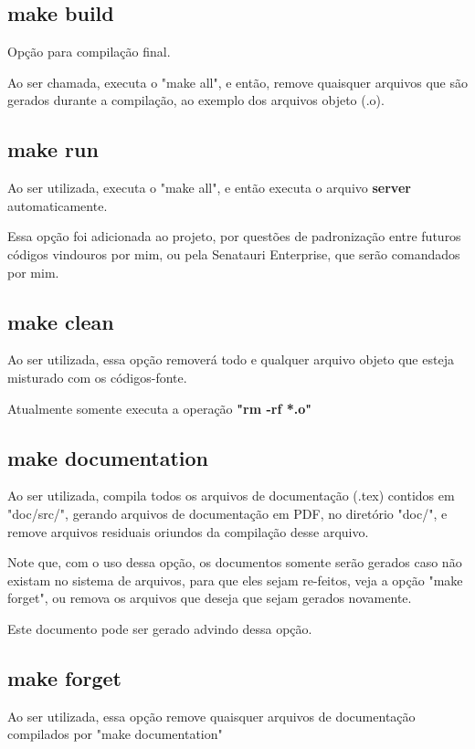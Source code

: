 \documentclass[onecolumn,12pt]{article}
\begin{document}
    	\subsection{make build}
    		Opção para compilação final.\par
    		Ao ser chamada, executa o "make all", e então, remove quaisquer arquivos que são gerados durante a compilação, ao exemplo dos arquivos objeto (.o).
    	
    	\subsection{make run}
    		Ao ser utilizada, executa o "make all", e então executa o arquivo \textbf{server} automaticamente.\par
    		Essa opção foi adicionada ao projeto, por questões de padronização entre futuros códigos vindouros por mim, ou pela Senatauri Enterprise, que serão comandados por mim.
    	
    	\subsection{make clean}
    		Ao ser utilizada, essa opção removerá todo e qualquer arquivo objeto que esteja misturado com os códigos-fonte.\par
    		Atualmente somente executa a operação \textbf{"rm -rf *.o"}
    	
    	\subsection{make documentation}
    		\par Ao ser utilizada, compila todos os arquivos de documentação (.tex) contidos em "doc/src/", gerando arquivos de documentação em PDF, no diretório "doc/", e remove arquivos residuais oriundos da compilação desse arquivo.\par
    		Note que, com o uso dessa opção, os documentos somente serão gerados caso não existam no sistema de arquivos, para que eles sejam re-feitos, veja a opção "make forget", ou remova os arquivos que deseja que sejam gerados novamente.\par
    		Este documento pode ser gerado advindo dessa opção.
    		
    	\subsection{make forget}
    		Ao ser utilizada, essa opção remove quaisquer arquivos de documentação compilados por "make documentation"
    	
\end{document}
